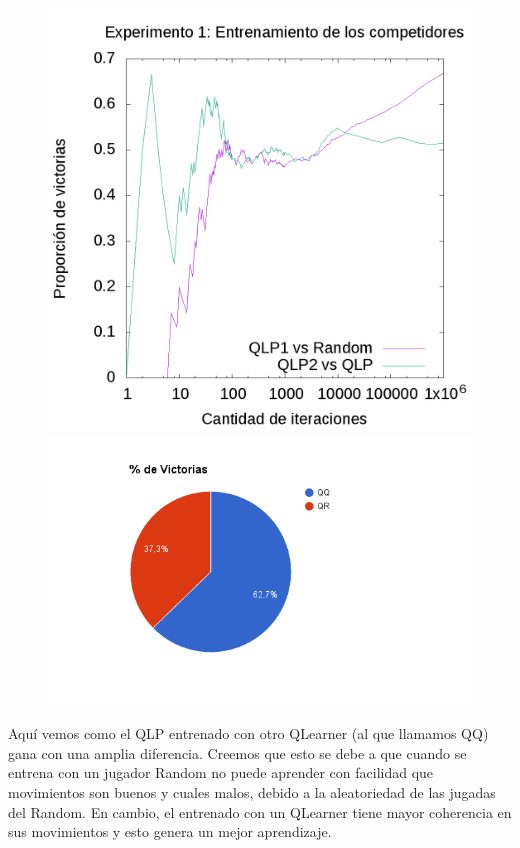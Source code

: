 \documentclass[10pt, a4paper]{article}
\begin{document}
\begin{figure}[H]
  \begin{minipage}[c]{1\textwidth}
    \includegraphics[scale=0.2]{E1train.png}
    \includegraphics[scale=0.45]{QRvsQQ.png}
  \end{minipage}
\end{figure}
Aquí vemos como el QLP entrenado con otro QLearner (al que llamamos QQ) gana con una amplia diferencia. Creemos que esto se debe a que cuando se entrena con un jugador Random no puede aprender con facilidad que movimientos son buenos y cuales malos, debido a la aleatoriedad de las jugadas del Random. En cambio, el entrenado con un QLearner tiene mayor coherencia en sus movimientos y esto genera un mejor aprendizaje.
\end{document}
